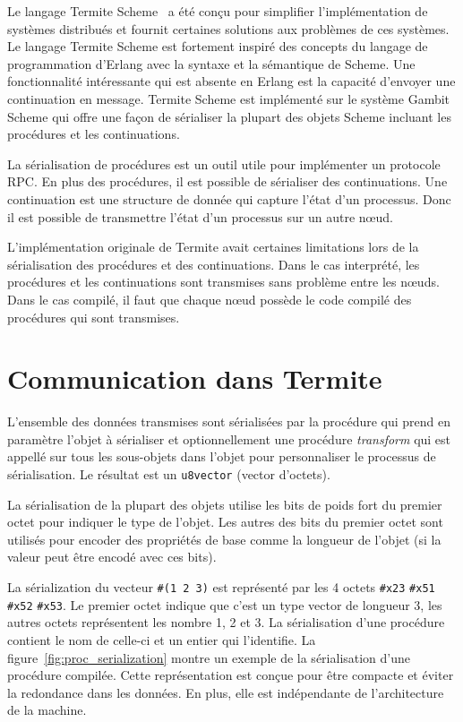 Le langage Termite Scheme~\cite{DBLP:conf/erlang/Germain06} a été conçu
pour simplifier l'implémentation de systèmes distribués et fournit
certaines solutions aux problèmes de ces systèmes. Le langage Termite Scheme est
fortement inspiré des concepts du langage de programmation d'Erlang avec la
syntaxe et la sémantique de Scheme. Une fonctionnalité intéressante qui est
absente en Erlang est la capacité d'envoyer une continuation en message.
Termite Scheme est implémenté sur le système Gambit Scheme qui offre
une façon de sérialiser la plupart des objets Scheme incluant les
procédures et les continuations.

La sérialisation de procédures est un outil utile pour implémenter
un protocole RPC. En plus des procédures, il est possible de sérialiser
des continuations. Une continuation est une structure de donnée qui capture
l'état d'un processus. Donc il est possible de transmettre l'état d'un
processus sur un autre nœud.

L'implémentation originale de Termite avait certaines limitations
lors de la sérialisation des procédures et des continuations. Dans
le cas interprété, les procédures et les continuations sont transmises
sans problème entre les nœuds. Dans le cas compilé, il faut que
chaque nœud possède le code compilé des procédures qui sont transmises.


\section{Communication dans Termite}

L'ensemble des données transmises sont sérialisées par la procédure
 qui prend en paramètre l'objet à sérialiser et
optionnellement une procédure \textit{transform} qui est appellé sur tous les
sous-objets dans l'objet pour personnaliser le processus de sérialisation. Le
résultat est un \texttt{u8vector} (vector d'octets).

La sérialisation de la plupart des objets utilise les bits de poids fort
du premier octet pour indiquer le type de l'objet. Les autres des bits du
premier octet sont utilisés pour encoder des propriétés de base comme la longueur
de l'objet (si la valeur peut être encodé avec ces bits).

La sérialization du vecteur \texttt{\#(1 2 3)} est représenté par les 4 octets
\texttt{\#x23} \texttt{\#x51} \texttt{\#x52} \texttt{\#x53}.  Le premier octet
indique que c'est un type vector de longueur 3, les autres octets représentent
les nombre 1, 2 et 3.  La sérialisation d'une procédure contient le nom de
celle-ci et un entier qui l'identifie. La figure~\ref{fig:proc_serialization}
montre un exemple de la sérialisation d'une procédure compilée. Cette
représentation est conçue pour être compacte et éviter la redondance dans les
données. En plus, elle est indépendante de l'architecture de la machine.

